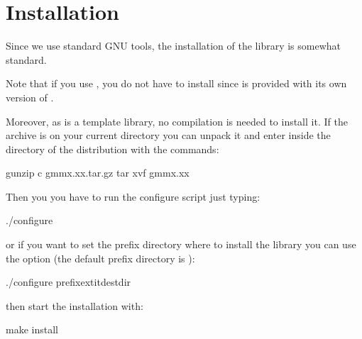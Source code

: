 \documentclass[a4paper,11pt,english]{sphinxmanual}
\begin{document}
\chapter{Installation}
\label{\detokenize{gmm/install:installation}}\label{\detokenize{gmm/install:gmm-install}}\label{\detokenize{gmm/install::doc}}
Since we use standard GNU tools, the installation of the  library is somewhat standard.

Note that if you use , you do not have to install  since  is provided with its own version of .

Moreover, as  is a template library, no compilation is needed to install it. If the   archive is on your current directory you can unpack it and enter inside the directory of the distribution  with the commands:

\begin{sphinxVerbatim}[commandchars=\\\{\}]
gunzip \PYGZhy{}c gmm\PYGZhy{}x.xx.tar.gz  tar xvf \PYGZhy{}
  gmm\PYGZhy{}x.xx
\end{sphinxVerbatim}

Then you you have to run the configure script just typing:

\begin{sphinxVerbatim}[commandchars=\\\{\}]
./configure
\end{sphinxVerbatim}

or if you want to set the prefix directory where to install the library you can use the  option (the default prefix directory is ):

\begin{sphinxVerbatim}[commandchars=\\\{\}]
./configure \PYGZhy{}\PYGZhy{}prefixextitdest\PYGZus{}dir
\end{sphinxVerbatim}

then start the installation with:

\begin{sphinxVerbatim}[commandchars=\\\{\}]
make install
\end{sphinxVerbatim}
\end{document}
